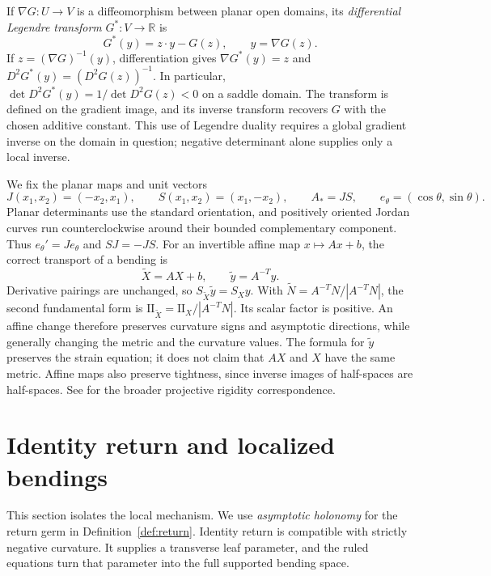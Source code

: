 \documentclass[11pt]{amsart}
\theoremstyle{definition}
\theoremstyle{remark}
\newcommand{\R}{\mathbb R}\newcommand{\Sph}{\mathbb S}
\newcommand{\II}{\mathrm{II}}\newcommand{\Gmap}{\mathcal G}
\numberwithin{equation}{section}
\begin{document}
If $\nabla G:U\to V$ is a diffeomorphism between planar open domains,
its \emph{differential Legendre transform} $G^*:V\to\R$ is
\[
 G^*(y)=z\cdot y-G(z),\qquad y=\nabla G(z).
\]
If $z=(\nabla G)^{-1}(y)$, differentiation gives
$\nabla G^*(y)=z$ and $D^2G^*(y)=(D^2G(z))^{-1}$.
In particular, $\det D^2G^*(y)=1/\det D^2G(z)<0$ on a saddle domain.
The transform is defined on the gradient image, and its inverse
transform recovers $G$ with the chosen additive constant. This use of
Legendre duality requires a global gradient inverse on the domain in
question; negative determinant alone supplies only a local inverse.

We fix the planar maps and unit vectors
\[
 J(x_1,x_2)=(-x_2,x_1),\qquad S(x_1,x_2)=(x_1,-x_2),
 \qquad A_*=JS,\qquad e_\theta=(\cos\theta,\sin\theta).
\]
Planar determinants use the standard orientation, and positively oriented
Jordan curves run counterclockwise around their bounded complementary
component. Thus $e_\theta'=Je_\theta$ and $SJ=-JS$.
For an invertible affine map $x\mapsto Ax+b$, the correct transport of
a bending is
\begin{equation}\label{eq:affine-transport}
 \widetilde X=AX+b,\qquad \widetilde y=A^{-T}y.
\end{equation}
Derivative pairings are unchanged, so $S_{\widetilde X}\widetilde y=S_Xy$.
With $\widetilde N=A^{-T}N/|A^{-T}N|$, the second fundamental form is
$\II_{\widetilde X}=\II_X/|A^{-T}N|$. Its scalar factor is positive.
An affine change therefore preserves curvature signs and asymptotic
directions, while generally changing the metric and the curvature values.
The formula for $\widetilde y$ preserves the strain equation; it does
not claim that $AX$ and $X$ have the same metric. Affine maps also preserve
tightness, since inverse images of half-spaces are half-spaces.
See \cite{IzmProj} for the broader projective rigidity correspondence.

\section{Identity return and localized bendings}\label{sec:theory}
\label{sec:ruled}
This section isolates the local mechanism. We use \emph{asymptotic
holonomy} for the return germ in Definition~\ref{def:return}.
Identity return is compatible with strictly negative curvature. It supplies a
transverse leaf parameter, and the ruled equations turn that parameter
into the full supported bending space.
\end{document}
